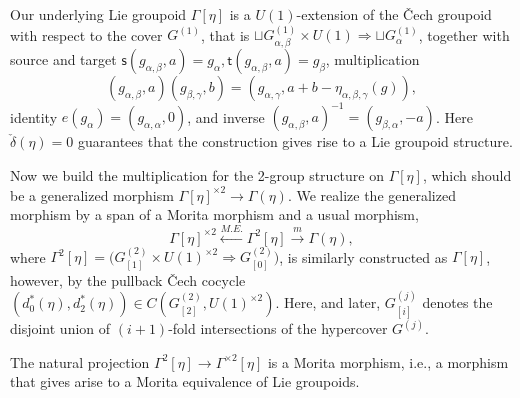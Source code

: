 \documentclass[letterpaper,10pt, oneside]{article} %
\newcommand{\bs}{\mathsf{s}}%
\newcommand{\bt}{\mathsf{t}}%
\begin{document}
Our underlying Lie groupoid $\Gamma[\eta]$ is a $U(1)$-extension of
the \v{C}ech groupoid with respect to the cover $G^{(1)}$, that is $
\sqcup G^{(1)}_{\alpha,\beta}\times U(1)\Rightarrow \sqcup
G^{(1)}_\alpha$, together with source and target
$\bs(g_{\alpha,\beta},a)=g_\alpha, \bt(g_{\alpha,\beta},a)=g_\beta$,  multiplication
$$(g_{\alpha, \beta},a)(g_{\beta,\gamma},b)=(g_{\alpha,\gamma},a+b-\eta_{\alpha,\beta,\gamma}(g)),$$
identity  $e(g_\alpha)=(g_{\alpha,\alpha},0)$, and inverse
$(g_{\alpha, \beta},a)^{-1}=(g_{\beta,\alpha},-a)$. Here
$\check{\delta}(\eta)=0$ guarantees that the construction gives rise to a Lie groupoid structure.


Now we build the multiplication for the 2-group structure on
$\Gamma[\eta]$, which should be a generalized morphism
$\Gamma[\eta]^{\times 2}\longrightarrow \Gamma(\eta)$. We realize the
generalized morphism by a span of a Morita morphism and a usual
morphism,  $$\Gamma[\eta]^{\times
  2} \stackrel{M.E.}{\longleftarrow}
\Gamma^2[\eta]\stackrel{m}{\longrightarrow}\Gamma(\eta),$$ where
$\Gamma^2[\eta]= \Big( G_{[1]}^{(2)}\times {U(1)}^{\times
  2}\Longrightarrow G_{[0]}^{(2)} \Big)$, is similarly constructed as
$\Gamma[\eta]$, however, by the pullback \v{C}ech
cocycle  $(d_0^*(\eta),d_2^*(\eta))\in C(G^{(2)}_{[2]},{U(1)}^{\times
  2})$. Here, and later, $G^{(j)}_{[i]}$ denotes the disjoint union of
$(i+1)$-fold intersections of the hypercover $G^{(j)}$.


The natural projection $\Gamma^2[\eta]\to \Gamma^{\times
  2}[\eta]$ is a Morita morphism, i.e.,  a morphism that gives arise to a
Morita equivalence of Lie groupoids.
\end{document}
